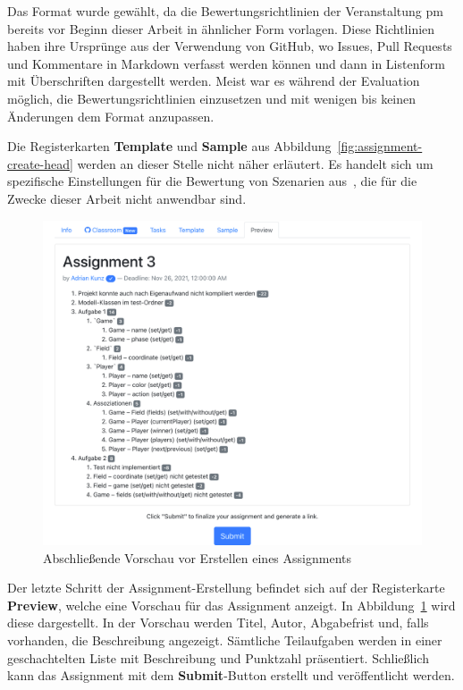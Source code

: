 Das Format wurde gewählt, da die Bewertungsrichtlinien der Veranstaltung \ac{pm} bereits vor Beginn dieser Arbeit in ähnlicher Form vorlagen.
Diese Richtlinien haben ihre Ursprünge aus der Verwendung von GitHub, wo Issues, Pull Requests und Kommentare in Markdown verfasst werden können und dann in Listenform mit Überschriften dargestellt werden.
Meist war es während der Evaluation möglich, die Bewertungsrichtlinien einzusetzen und mit wenigen bis keinen Änderungen dem Format anzupassen.

Die Registerkarten \textbf{Template} und \textbf{Sample} aus Abbildung~\ref{fig:assignment-create-head} werden an dieser Stelle nicht näher erläutert.
Es handelt sich um spezifische Einstellungen für die Bewertung von Szenarien aus~\cite{bachelor-thesis}, die für die Zwecke dieser Arbeit nicht anwendbar sind.

\begin{figure}
    \centering
    \includegraphics[width=\textwidth]{images/assignment-create-preview}
    \caption{Abschließende Vorschau vor Erstellen eines Assignments}
    \label{fig:assignment-create-preview}
\end{figure}

Der letzte Schritt der Assignment-Erstellung befindet sich auf der Registerkarte \textbf{Preview}, welche eine Vorschau für das Assignment anzeigt.
In Abbildung~\ref{fig:assignment-create-preview} wird diese dargestellt.
In der Vorschau werden Titel, Autor, Abgabefrist und, falls vorhanden, die Beschreibung angezeigt.
Sämtliche Teilaufgaben werden in einer geschachtelten Liste mit Beschreibung und Punktzahl präsentiert.
Schließlich kann das Assignment mit dem \textbf{Submit}-Button erstellt und veröffentlicht werden.

